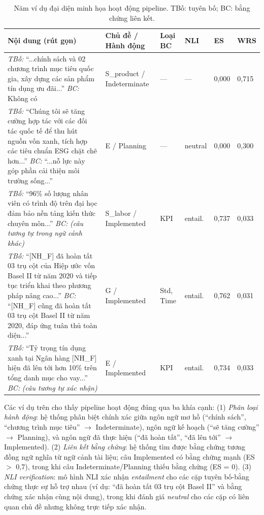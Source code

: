 \begin{table}[H]
\centering
\caption{Năm ví dụ đại diện minh họa hoạt động pipeline. TBố: tuyên bố; BC: bằng chứng liên kết.}
\label{tab:qual_examples}
\footnotesize
\begin{tabular}{p{}p{}p{}p{}p{}p{}}
\toprule
\textbf{Nội dung (rút gọn)} & \textbf{Chủ đề / Hành động} & \textbf{Loại BC} & \textbf{NLI} & \textbf{ES} & \textbf{WRS} \\
\midrule
\textit{TBố:} ``...chính sách và 02 chương trình mục tiêu quốc gia, xây dựng các sản phẩm tín dụng ưu đãi...'' \newline \textit{BC:} Không có
    & S\_product / Indeterminate & --- & --- & 0,000 & 0,715 \\
\midrule
\textit{TBố:} ``Chúng tôi sẽ tăng cường hợp tác với các đối tác quốc tế để thu hút nguồn vốn xanh, tích hợp các tiêu chuẩn ESG chặt chẽ hơn...'' \newline \textit{BC:} ``...nỗ lực này góp phần cải thiện môi trường sống...''
    & E / Planning & --- & neutral & 0,000 & 0,300 \\
\midrule
\textit{TBố:} ``96\% số lượng nhân viên có trình độ trên đại học đảm bảo nền tảng kiến thức chuyên môn...'' \newline \textit{BC:} \textit{(câu tương tự trong ngữ cảnh khác)}
    & S\_labor / Implemented & KPI & entail. & 0,737 & 0,033 \\
\midrule
\textit{TBố:} ``[NH\_F] đã hoàn tất 03 trụ cột của Hiệp ước vốn Basel II từ năm 2020 và tiếp tục triển khai theo phương pháp nâng cao...'' \newline \textit{BC:} ``[NH\_F] cũng đã hoàn tất 03 trụ cột Basel II từ năm 2020, đáp ứng tuân thủ toàn diện...''
    & G / Implemented & Std, Time & entail. & 0,762 & 0,031 \\
\midrule
\textit{TBố:} ``Tỷ trọng tín dụng xanh tại Ngân hàng [NH\_F] hiện đã lên tới hơn 10\% trên tổng danh mục cho vay...'' \newline \textit{BC:} \textit{(câu tương tự xác nhận)}
    & E / Implemented & KPI & entail. & 0,734 & 0,033 \\
\bottomrule
\end{tabular}
\end{table}

Các ví dụ trên cho thấy pipeline hoạt động đúng qua ba khía cạnh: (1) \textit{Phân loại hành động}: hệ thống phân biệt chính xác giữa ngôn ngữ mơ hồ (``chính sách'', ``chương trình mục tiêu'' $\to$ Indeterminate), ngôn ngữ kế hoạch (``sẽ tăng cường'' $\to$ Planning), và ngôn ngữ đã thực hiện (``đã hoàn tất'', ``đã lên tới'' $\to$ Implemented). (2) \textit{Liên kết bằng chứng}: hệ thống tìm được bằng chứng tương đồng ngữ nghĩa từ ngữ cảnh tài liệu; câu Implemented có bằng chứng mạnh (ES $>$ 0,7), trong khi câu Indeterminate/Planning thiếu bằng chứng (ES = 0). (3) \textit{NLI verification}: mô hình NLI xác nhận \textit{entailment} cho các cặp tuyên bố-bằng chứng thực sự hỗ trợ nhau (ví dụ: ``đã hoàn tất 03 trụ cột Basel II'' và bằng chứng xác nhận cùng nội dung), trong khi đánh giá \textit{neutral} cho các cặp có liên quan chủ đề nhưng không trực tiếp xác nhận.


